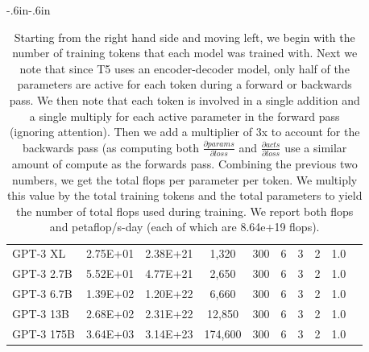 \begin{table}[!h]
\begin{adjustwidth}{-.6in}{-.6in}
{\begin{center}
\begin{tabular}{lccccccccc}
                  GPT-3 XL &                      2.75E+01 &                    2.38E+21 &      1,320 &                        300 &                               6 &                       3 &                                         2 &                                      1.0 &   \\
                GPT-3 2.7B &                      5.52E+01 &                    4.77E+21 &      2,650 &                        300 &                               6 &                       3 &                                         2 &                                      1.0 &   \\
                GPT-3 6.7B &                      1.39E+02 &                    1.20E+22 &      6,660 &                        300 &                               6 &                       3 &                                         2 &                                      1.0 &   \\
                 GPT-3 13B &                      2.68E+02 &                    2.31E+22 &     12,850 &                        300 &                               6 &                       3 &                                         2 &                                      1.0 &   \\
                GPT-3 175B &                      3.64E+03 &                    3.14E+23 &    174,600 &                        300 &                               6 &                       3 &                                         2 &                                      1.0 &   \\
            \bottomrule
            \end{tabular}
            \end{center}
            }
            
\end{adjustwidth}
        \caption{
Starting from the right hand side and moving left, we begin with the number of training tokens that each model was trained with. Next we note that since T5 uses an encoder-decoder model, only half of the parameters are active for each token during a forward or backwards pass. We then note that each token is involved in a single addition and a single multiply for each active parameter in the forward pass (ignoring attention). Then we add a multiplier of 3x to account for the backwards pass (as computing both $\frac{\partial{params}}{\partial{loss}}$ and $\frac{\partial{acts}}{\partial{loss}}$ use a similar amount of compute as the forwards pass. Combining the previous two numbers, we get the total flops per parameter per token. We multiply this value by the total training tokens and the total parameters to yield the number of total flops used during training. We report both flops and petaflop/s-day (each of which are 8.64e+19 flops).
        }

\label{table:total_compute_calculations}
\end{table}
